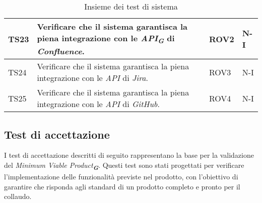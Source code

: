 \begin{table}[h!]
\begin{tabularx}{\textwidth}{|p{}|X|p{}|p{}|}
    TS23 & Verificare che il sistema garantisca la piena integrazione con le \emph{API}\textsubscript{\textit{\textbf{G}}} di \emph{Confluence}. & ROV2 & N-I \\ \hline
    TS24 & Verificare che il sistema garantisca la piena integrazione con le \emph{API} di \emph{Jira}. & ROV3 & N-I \\ \hline
    TS25 & Verificare che il sistema garantisca la piena integrazione con le \emph{API} di \emph{GitHub}. & ROV4 & N-I \\ \hline
    \end{tabularx}
    \caption{Insieme dei test di sistema}
\end{table}
\newpage


\subsection{Test di accettazione}
\label{sec:Test di accettazione}
I test di accettazione descritti di seguito rappresentano la base per la validazione del \emph{Minimum Viable Product}\textsubscript{\textit{\textbf{G}}}. Questi test sono stati progettati per verificare l’implementazione delle funzionalità previste nel prodotto, con l’obiettivo di garantire che risponda agli standard di un prodotto completo e pronto per il collaudo.

